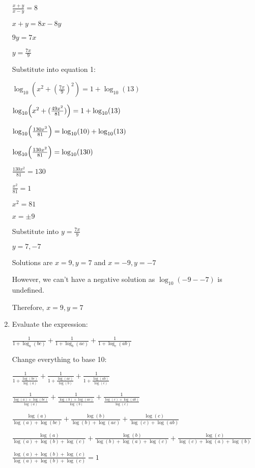 \documentclass[../main.tex]{subfiles}
\begin{document}
\begin{enumerate}[itemsep=0.4cm]
    $\frac{x+y}{x-y}=8$

    $x+y=8x-8y$

    $9y=7x$

    $y=\frac{7x}{9}$

    Substitute into equation 1:

    \(\log_{10}(x^2+(\frac{7x}{9})^2)=1+\log_{10}(13)\)

    \(\log_{10}\Bigl(x^2+(\frac{49x^2}{81})\Bigr)=1+\log_{10}(13)\)

    $\log_{10}\Bigl(\frac{130x^2}{81}\Bigr)=\log_{10}(10)+\log_{10}(13)$

    $\log_{10}\Bigl(\frac{130x^2}{81}\Bigr)=\log_{10}(130)$

    $\frac{130x^2}{81}=130$

    $\frac{x^2}{81}=1$

    $x^2=81$

    $x=\pm 9$

    Substitute into $y=\frac{7x}{9}$

    $y=7, -7$

    Solutions are $x=9, y=7$ and $x=-9, y=-7$

    However, we can't have a negative solution as $\log_{10}(-9--7)$ is undefined.

    Therefore, $x=9, y=7$


    \item 
    Evaluate the expression:

    \(\frac{1}{1+\log_a(bc)}+\frac{1}{1+\log_b(ac)}+\frac{1}{1+\log_c(ab)} \)

    Change everything to base 10:

    $\frac{1}{1+\frac{\log(bc)}{\log(a)}}+\frac{1}{1+\frac{\log(ac)}{\log(b)}}+\frac{1}{1+\frac{\log(ab)}{\log(c)}}$

    $\frac{1}{\frac{\log(a)+\log(bc)}{\log(a)}}+\frac{1}{\frac{\log(b)+\log(ac)}{\log(b)}}+\frac{1}{\frac{\log(c)+\log(ab)}{\log(c)}}$

    $\frac{\log(a)}{\log(a)+\log(bc)}+\frac{\log(b)}{\log(b)+\log(ac)}+\frac{\log(c)}{\log(c)+\log(ab)}$

    $\frac{\log(a)}{\log(a)+\log(b)+\log(c)}+\frac{\log(b)}{\log(b)+\log(a)+\log(c)}+\frac{\log(c)}{\log(c)+\log(a)+\log(b)}$

    $\frac{\log(a)+\log(b)+\log(c)}{\log(a)+\log(b)+\log(c)}=1$
\end{enumerate}
\end{document}
